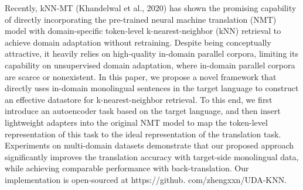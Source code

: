 Recently, kNN-MT (Khandelwal et al., 2020) has shown the promising capability of directly incorporating the pre-trained neural machine translation (NMT) model with domain-specific token-level k-nearest-neighbor (kNN) retrieval to achieve domain adaptation without retraining. Despite being conceptually attractive, it heavily relies on high-quality in-domain parallel corpora, limiting its capability on unsupervised domain adaptation, where in-domain parallel corpora are scarce or nonexistent. In this paper, we propose a novel framework that directly uses in-domain monolingual sentences in the target language to construct an effective datastore for k-nearest-neighbor retrieval. To this end, we first introduce an autoencoder task based on the target language, and then insert lightweight adapters into the original NMT model to map the token-level representation of this task to the ideal representation of the translation task. Experiments on multi-domain datasets demonstrate that our proposed approach significantly improves the translation accuracy with target-side monolingual data, while achieving comparable performance with back-translation. Our implementation is open-sourced at https://github. com/zhengxxn/UDA-KNN.

